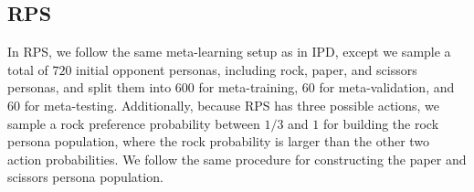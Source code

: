
\subsection{RPS}
In RPS, we follow the same meta-learning setup as in IPD, except we sample a total of $720$ initial opponent personas, including rock, paper, and scissors personas, and split them into $600$ for meta-training, $60$ for meta-validation, and $60$ for meta-testing. 
Additionally, because RPS has three possible actions, we sample a rock preference probability between $1/3$ and $1$ for building the rock persona population, where the rock probability is larger than the other two action probabilities. We follow the same procedure for constructing the paper and scissors persona population.

